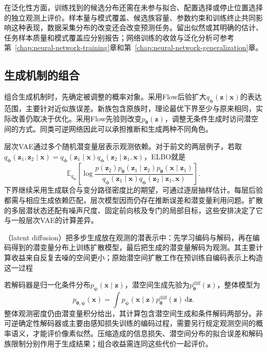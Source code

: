 在泛化性方面，训练找到的候选分布还需在未参与拟合、配置选择或停止位置选择的独立观测上评价。样本量与模式覆盖、候选族容量、参数约束和训练终止共同影响这种表现，数据采集分布的改变还会改变预测任务。留出似然或其明确的估计、任务样本质量和模式覆盖应分别报告；网络训练的收敛与泛化分析可参考第~\ref{chap:neural-network-training}章和第~\ref{chap:neural-network-generalization}章。

\subsection{生成机制的组合}
\label{sec:pgm-generative-hybrids}

组合生成机制时，先确定被调整的概率对象。采用Flow后验扩大$q_{\bm{\phi}}(\bm{z}\mid\bm{x})$的表达范围，主要针对近似族误差。新族包含原族时，理论最优下界至少与原来相同，实际改善仍取决于优化。采用Flow先验则改变$p_{\bm{\theta}}(\bm{z})$，调整无条件生成时访问潜空间的方式。同类可逆网络因此可以承担推断和生成两种不同角色。

层次VAE通过多个随机潜变量层表示观测依赖。对于前文的两层例子，若取$q_{\bm{\phi}}(\bm{z}_1,\bm{z}_2\mid\bm{x})=q_{\bm{\phi}}(\bm{z}_1\mid\bm{x})q_{\bm{\phi}}(\bm{z}_2\mid\bm{z}_1,\bm{x})$，ELBO就是
\[
  \mathbb{E}_{q_{\bm{\phi}}}
  \left[
    \log\frac{
      p(\bm{z}_2)p_{\bm{\theta}}(\bm{z}_1\mid\bm{z}_2)
          p_{\bm{\theta}}(\bm{x}\mid\bm{z}_1)}
      {q_{\bm{\phi}}(\bm{z}_1\mid\bm{x})
          q_{\bm{\phi}}(\bm{z}_2\mid\bm{z}_1,\bm{x})}
  \right].
\]
下界继续采用生成联合与变分路径密度比的期望，可通过逐层抽样估计。每层后验都需与相应生成依赖匹配，层次模型因而仍存在推断误差和潜变量利用问题。扩散的多层潜状态还配有噪声尺度、固定前向核及专门的局部目标，这些安排决定了它与一般层次VAE的计算差异。

（latent diffusion）把多步生成放在观测的潜表示中：先学习编码与解码，再在编码得到的潜变量分布上训练扩散模型，最后把生成的潜变量解码为观测。其主要计算收益来自反复去噪的空间更小；原始潜空间扩散工作在预训练自编码表示上构造这一过程

若解码器是归一化条件分布$p_{\bm{\psi}}(\bm{x}\mid\bm{z})$，潜空间生成先验为$p_{\bm{\theta}}^{\mathrm{diff}}(\bm{z})$，整体模型为
\begin{equation}
  \label{eq:pgm-generative-latent-diffusion}
  p_{\bm{\theta},\bm{\psi}}(\bm{x})
  =\int p_{\bm{\psi}}(\bm{x}\mid\bm{z})
          p_{\bm{\theta}}^{\mathrm{diff}}(\bm{z})\,\mathrm{d}\bm{z}.
\end{equation}
整体观测密度仍由潜变量积分给出，其计算包含潜空间生成和条件解码两部分。非可逆确定性解码器或主要由感知损失训练的编码过程，需要另行规定观测空间的概率语义，才能评价像素似然。压缩造成的信息损失、潜空间分布的拟合误差和解码族限制分别作用于生成结果；组合收益需连同这些代价一起评价。

